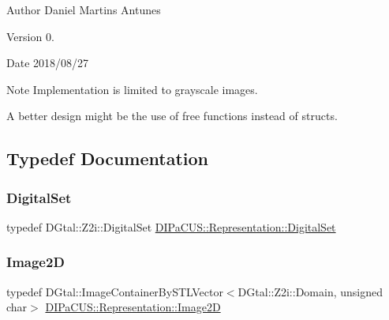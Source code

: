 \begin{DoxyAuthor}{Author}
Daniel Martins Antunes 
\end{DoxyAuthor}
\begin{DoxyVersion}{Version}
0. 
\end{DoxyVersion}
\begin{DoxyDate}{Date}
2018/08/27 
\end{DoxyDate}
\begin{DoxyNote}{Note}
Implementation is limited to grayscale images. 

A better design might be the use of free functions instead of structs. 
\end{DoxyNote}


\subsection{Typedef Documentation}
\mbox{\label{namespaceDIPaCUS_1_1Representation_a6eca0b4fa262f2d600f11d82ee10b5a6}} 
\subsubsection{\texorpdfstring{Digital\+Set}{DigitalSet}}
{\footnotesize\ttfamily typedef D\+Gtal\+::\+Z2i\+::\+Digital\+Set \hyperlink{namespaceDIPaCUS_1_1Representation_a6eca0b4fa262f2d600f11d82ee10b5a6}{D\+I\+Pa\+C\+U\+S\+::\+Representation\+::\+Digital\+Set}}

\mbox{\label{namespaceDIPaCUS_1_1Representation_ae97917e89f57298fda1626daad9f1733}} 
\subsubsection{\texorpdfstring{Image2D}{Image2D}}
{\footnotesize\ttfamily typedef D\+Gtal\+::\+Image\+Container\+By\+S\+T\+L\+Vector$<$D\+Gtal\+::\+Z2i\+::\+Domain, unsigned char$>$ \hyperlink{namespaceDIPaCUS_1_1Representation_ae97917e89f57298fda1626daad9f1733}{D\+I\+Pa\+C\+U\+S\+::\+Representation\+::\+Image2D}}

